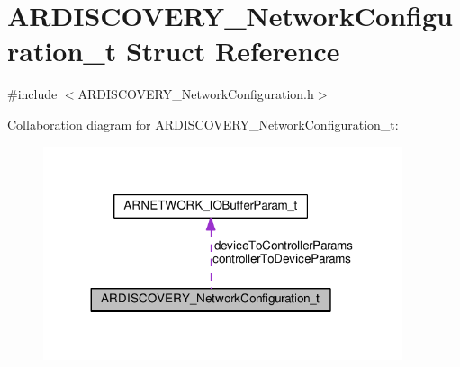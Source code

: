 \hypertarget{struct_a_r_d_i_s_c_o_v_e_r_y___network_configuration__t}{}\section{A\+R\+D\+I\+S\+C\+O\+V\+E\+R\+Y\+\_\+\+Network\+Configuration\+\_\+t Struct Reference}
\label{struct_a_r_d_i_s_c_o_v_e_r_y___network_configuration__t}


{\ttfamily \#include $<$A\+R\+D\+I\+S\+C\+O\+V\+E\+R\+Y\+\_\+\+Network\+Configuration.\+h$>$}



Collaboration diagram for A\+R\+D\+I\+S\+C\+O\+V\+E\+R\+Y\+\_\+\+Network\+Configuration\+\_\+t\+:
\nopagebreak
\begin{figure}[H]
\begin{center}
\leavevmode
\includegraphics[width=299pt]{struct_a_r_d_i_s_c_o_v_e_r_y___network_configuration__t__coll__graph}
\end{center}
\end{figure}

